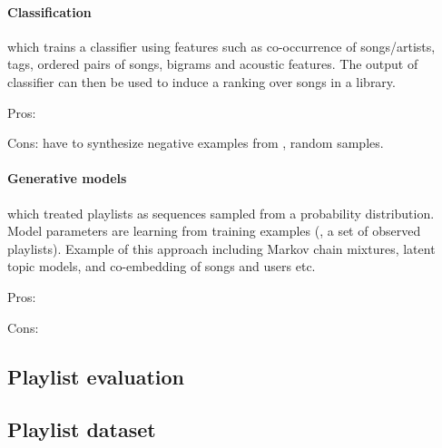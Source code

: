 \paragraph{Classification} which trains a classifier using features such as co-occurrence of songs/artists, tags, 
ordered pairs of songs, bigrams and acoustic features. The output of classifier can then be used to induce a ranking over songs in a library.
\begin{description}
\item Pros: 
\item Cons: have to synthesize negative examples from \eg, random samples.
\end{description}


\paragraph{Generative models} which treated playlists as sequences sampled from a probability distribution. 
Model parameters are learning from training examples (\ie, a set of observed playlists).
Example of this approach including Markov chain mixtures, latent topic models, and co-embedding of songs and users etc.
\begin{description}
\item Pros: 
\item Cons: 
\end{description}


\subsection{Playlist evaluation}


\subsection{Playlist dataset}
